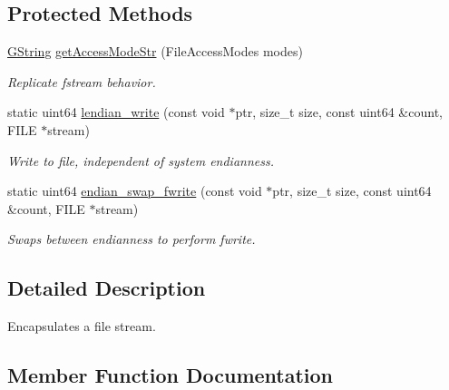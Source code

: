 \subsection*{Protected Methods}
\begin{DoxyCompactItemize}
\item 
\mbox{\label{classrev_1_1_file_stream_a9c531c864515737ea0e4d11820896d69}} 
\mbox{\hyperlink{classrev_1_1_g_string}{G\+String}} \mbox{\hyperlink{classrev_1_1_file_stream_a9c531c864515737ea0e4d11820896d69}{get\+Access\+Mode\+Str}} (File\+Access\+Modes modes)
\begin{DoxyCompactList}\small\item\em Replicate fstream behavior. \end{DoxyCompactList}\item 
static uint64 \mbox{\hyperlink{classrev_1_1_file_stream_a482c8ed3834230ebe085b12396286a3a}{lendian\+\_\+write}} (const void $\ast$ptr, size\+\_\+t size, const uint64 \&count, F\+I\+LE $\ast$stream)
\begin{DoxyCompactList}\small\item\em Write to file, independent of system endianness. \end{DoxyCompactList}\item 
\mbox{\label{classrev_1_1_file_stream_a8ec1f0e9db50f479e2312616ab0ef0dc}} 
static uint64 \mbox{\hyperlink{classrev_1_1_file_stream_a8ec1f0e9db50f479e2312616ab0ef0dc}{endian\+\_\+swap\+\_\+fwrite}} (const void $\ast$ptr, size\+\_\+t size, const uint64 \&count, F\+I\+LE $\ast$stream)
\begin{DoxyCompactList}\small\item\em Swaps between endianness to perform fwrite. \end{DoxyCompactList}\end{DoxyCompactItemize}


\subsection{Detailed Description}
Encapsulates a file stream. 

\subsection{Member Function Documentation}
\mbox{\label{classrev_1_1_file_stream_a699b309e32c3aa9a0e1842b4fe7c810f}} 
